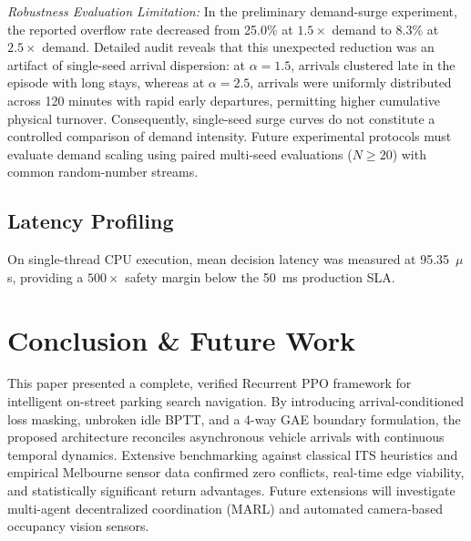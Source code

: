 \documentclass[journal]{IEEEtran}
\begin{document}
\textit{Robustness Evaluation Limitation:} In the preliminary demand-surge experiment, the reported overflow rate decreased from 25.0\% at $1.5\times$ demand to 8.3\% at $2.5\times$ demand. Detailed audit reveals that this unexpected reduction was an artifact of single-seed arrival dispersion: at $\alpha = 1.5$, arrivals clustered late in the episode with long stays, whereas at $\alpha = 2.5$, arrivals were uniformly distributed across 120 minutes with rapid early departures, permitting higher cumulative physical turnover. Consequently, single-seed surge curves do not constitute a controlled comparison of demand intensity. Future experimental protocols must evaluate demand scaling using paired multi-seed evaluations ($N \ge 20$) with common random-number streams.

\subsection{Latency Profiling}
On single-thread CPU execution, mean decision latency was measured at 95.35~$\mu$s, providing a $500\times$ safety margin below the 50~ms production SLA.

\section{Conclusion \& Future Work}
This paper presented a complete, verified Recurrent PPO framework for intelligent on-street parking search navigation. By introducing arrival-conditioned loss masking, unbroken idle BPTT, and a 4-way GAE boundary formulation, the proposed architecture reconciles asynchronous vehicle arrivals with continuous temporal dynamics. Extensive benchmarking against classical ITS heuristics and empirical Melbourne sensor data confirmed zero conflicts, real-time edge viability, and statistically significant return advantages. Future extensions will investigate multi-agent decentralized coordination (MARL) and automated camera-based occupancy vision sensors.



\end{document}
